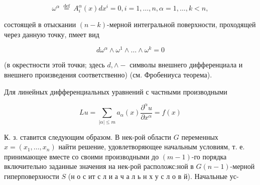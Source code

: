 \documentclass[10pt]{article}
\begin{document}
\[

\omega^{\alpha} \stackrel{\text { def }}{=} A_{i}^{\alpha}(x) d x^{i}=0, i=1, \ldots, n, \alpha=1, \ldots, k<n,

\]



состоящей в отыскании $(n-k)$-мерной интегральной поверхности, проходящей через данную точку, пмеет вид



\[

d \omega^{\alpha} \wedge \omega^{1} \wedge \ldots \wedge \omega^{k}=0

\]



(в окрестности этой точки; здесь $d, \wedge-$ символы внешнего дифференциала и внешнего произведения соответственно) (см. Фробениуса теорема).



Для линейных дифференциальных уравнений с частными производными



\[

L u=\sum_{|\alpha| \leqslant m} a_{\alpha}(x) \frac{\partial^{\alpha} u}{\partial x^{\alpha}}=f(x)

\]



К. з. ставится следующим образом. В нек-рой области $G$ переменных $x=\left(x_{1}, \ldots, x_{n}\right)$ найти решение, удовлетворяющее начальным условиям, т. е. принимающее вместе со своими производными до $(m-1)$-го порядка включительно заданные значения на нек-рой расположс:ной в $G(n-1)$-мерной гиперповерхности $S$ (н о с ит с л и а ч а л ь н х у с л о в й). Начальные ус-
\end{document}
